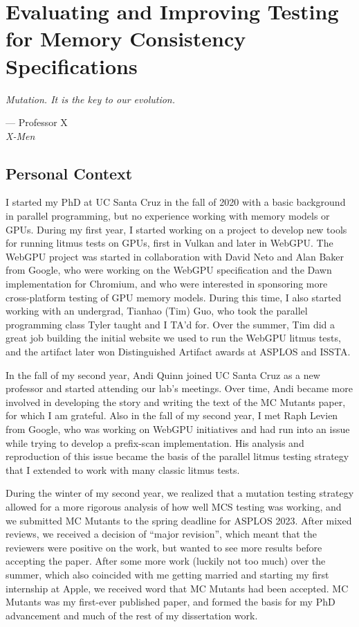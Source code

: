 \chapter[Evaluating and Improving Testing for Memory Consistency Specifications]{Evaluating and Improving Testing for Memory Consistency Specifications}
\label{chap:mc-mutants}

\epigraph{\textit{Mutation. It is the key to our evolution.}}{--- Professor X \\\footnotesize\textit{X-Men}}


\newcommand{\sys}{MC Mutants\xspace}

\section{Personal Context}

I started my PhD at UC Santa Cruz in the fall of 2020 with a basic background in parallel programming, but no experience working with memory models or GPUs. During my first year, I started working on a project to develop new tools for running litmus tests on GPUs, first in Vulkan and later in WebGPU. The WebGPU project was started in collaboration with David Neto and Alan Baker from Google, who were working on the WebGPU specification and the Dawn implementation for Chromium, and who were interested in sponsoring more cross-platform testing of GPU memory models. During this time, I also started working with an undergrad, Tianhao (Tim) Guo, who took the parallel programming class Tyler taught and I TA'd for. Over the summer, Tim did a great job building the initial website we used to run the WebGPU litmus tests, and the artifact later won Distinguished Artifact awards at ASPLOS and ISSTA.

In the fall of my second year, Andi Quinn joined UC Santa Cruz as a new professor and started attending our lab's meetings. Over time, Andi became more involved in developing the story and writing the text of the MC Mutants paper, for which I am grateful. Also in the fall of my second year, I met Raph Levien from Google, who was working on WebGPU initiatives and had run into an issue while trying to develop a prefix-scan implementation. His analysis and reproduction of this issue became the basis of the parallel litmus testing strategy that I extended to work with many classic litmus tests.

During the winter of my second year, we realized that a mutation testing strategy allowed for a more rigorous analysis of how well MCS testing was working, and we submitted MC Mutants to the spring deadline for ASPLOS 2023. After mixed reviews, we received a decision of ``major revision'', which meant that the reviewers were positive on the work, but wanted to see more results before accepting the paper. After some more work (luckily not too much) over the summer, which also coincided with me getting married and starting my first internship at Apple, we received word that MC Mutants had been accepted. MC Mutants was my first-ever published paper, and formed the basis for my PhD advancement and much of the rest of my dissertation work.

